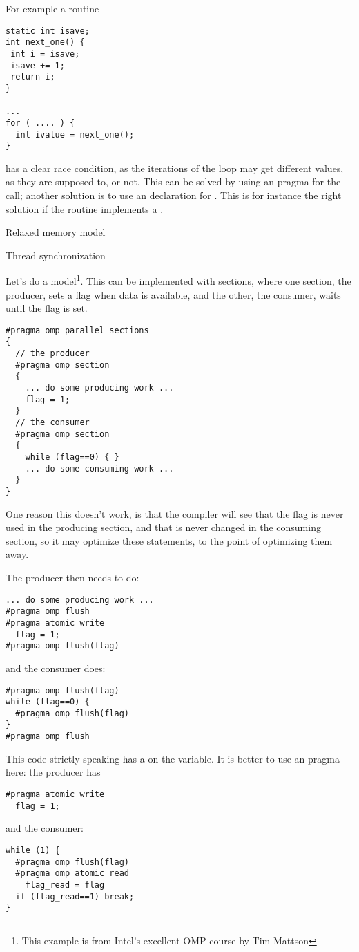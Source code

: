 For example a routine
\begin{verbatim}
static int isave;
int next_one() {
 int i = isave;
 isave += 1;
 return i;
}

...
for ( .... ) {
  int ivalue = next_one();
}
\end{verbatim}
has a clear race condition, as the iterations of the loop
may get different  values, as they are supposed to,
or not. This can be solved by using an 
pragma for the  call; another solution 
is to use an  declaration for .
This is for instance the right solution if  the 
routine implements a .


 {Relaxed memory model}

 {Thread synchronization}

Let's do a  model\footnote{This example
  is from Intel's excellent OMP course by Tim Mattson}.  This can be
implemented with sections, where one section, the producer, sets a
flag when data is available, and the other, the consumer, waits until
the flag is set.
\begin{verbatim}
#pragma omp parallel sections
{
  // the producer
  #pragma omp section
  {
    ... do some producing work ...
    flag = 1;
  }
  // the consumer
  #pragma omp section
  {
    while (flag==0) { }
    ... do some consuming work ...
  }
}
\end{verbatim}
One reason this doesn't work, is that the compiler will see that the flag is never used
in the producing section, and that is never changed in the consuming section, so
it may optimize these statements, to the point of optimizing them away.

The producer then needs to do:
\begin{verbatim}
... do some producing work ...
#pragma omp flush
#pragma atomic write
  flag = 1;
#pragma omp flush(flag)
\end{verbatim}
and the consumer does:
\begin{verbatim}
#pragma omp flush(flag)
while (flag==0) {
  #pragma omp flush(flag)
}
#pragma omp flush
\end{verbatim}
This code strictly speaking has a  on the  variable.
It is better to use an  pragma here: the producer has
\begin{verbatim}
#pragma atomic write
  flag = 1;
\end{verbatim}
and the consumer:
\begin{verbatim}
while (1) {
  #pragma omp flush(flag)
  #pragma omp atomic read
    flag_read = flag
  if (flag_read==1) break;
}
\end{verbatim}

